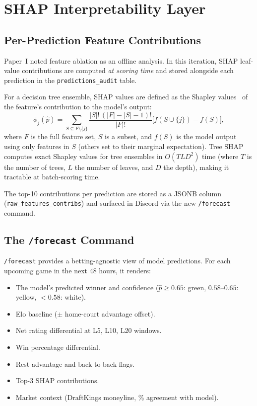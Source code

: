 \documentclass[conference]{IEEEtran}
\begin{document}
\section{SHAP Interpretability Layer}
\label{sec:shap}

\subsection{Per-Prediction Feature Contributions}

Paper~I noted feature ablation as an offline analysis.  In this
iteration, SHAP leaf-value contributions are computed \emph{at
scoring time} and stored alongside each prediction in the
\texttt{predictions\_audit} table.

For a decision tree ensemble, SHAP values are defined as the Shapley
values~\cite{shapley1953} of the feature's contribution to the
model's output:
\begin{equation}
  \phi_j(\hat{p}) = \sum_{S \subseteq F \setminus \{j\}}
    \frac{|S|!\,(|F|-|S|-1)!}{|F|!}
    \bigl[f(S\cup\{j\}) - f(S)\bigr],
  \label{eq:shap}
\end{equation}
where $F$ is the full feature set, $S$ is a subset, and
$f(S)$ is the model output using only features in $S$
(others set to their marginal expectation).
Tree SHAP~\cite{lundberg2018} computes exact Shapley values for
tree ensembles in $O(TLD^2)$ time (where $T$ is the number of
trees, $L$ the number of leaves, and $D$ the depth), making it
tractable at batch-scoring time.

The top-10 contributions per prediction are stored as a JSONB column
(\texttt{raw\_features\_contribs}) and surfaced in Discord via
the new \texttt{/forecast} command.

\subsection{The \texttt{/forecast} Command}
\label{subsec:forecast}

\texttt{/forecast} provides a
betting-agnostic view of model predictions.  For each upcoming game in
the next 48 hours, it renders:
\begin{itemize}
  \item The model's predicted winner and confidence
        ($\hat{p} \geq 0.65$: green, $0.58$--$0.65$: yellow, $<0.58$: white).
  \item Elo baseline ($\pm$ home-court advantage offset).
  \item Net rating differential at L5, L10, L20 windows.
  \item Win percentage differential.
  \item Rest advantage and back-to-back flags.
  \item Top-3 SHAP contributions.
  \item Market context (DraftKings moneyline, \% agreement with model).
\end{itemize}
\end{document}
